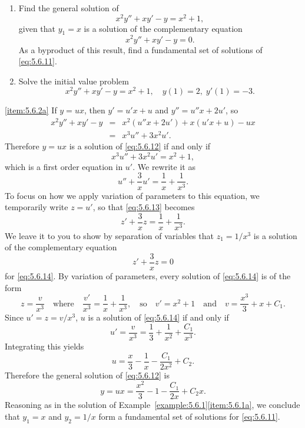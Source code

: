 \documentclass{ximera}
\begin{document}
\begin{example}\label{example:5.6.2}
\begin{enumerate}
\item \label{item:5.6.2a} %
Find the general solution of
$$
x^2y''+xy'-y=x^2+1,
$$
 given that $y_1=x$ is a solution of the complementary
equation
\begin{equation}  \label{eq:5.6.11}
x^2y''+xy'-y=0.
\end{equation}
  As a byproduct of this result, find a fundamental set of
solutions of \eqref{eq:5.6.11}.
 
\item \label{item:5.6.2b}%
Solve the initial value problem
\begin{equation}  \label{eq:5.6.12}
x^2y''+xy'-y=x^2+1, \quad   y(1)=2,\;  y'(1)=-3.
\end{equation}
\end{enumerate}
 
 
\begin{explanation}\ref{item:5.6.2a} If $y=ux$, then $y'=u'x+u$ and $y''=u''x+2u'$, so
\begin{eqnarray*}
x^2y''+xy'-y&=&x^2(u''x+2u')+x(u'x+u)-ux\\
&=&x^3u''+3x^2u'.
\end{eqnarray*}
Therefore $y=ux$ is a solution of \eqref{eq:5.6.12} if and only if
$$
x^3u''+3x^2u'=x^2+1,
$$
which is a first order equation in $u'$.
We rewrite it as
\begin{equation} \label{eq:5.6.13}
u''+\frac{3}{x}u'=\frac{1}{x}+\frac{1}{x^3}.
\end{equation}
To focus on how we apply variation of parameters to this equation, we
temporarily write $z=u'$, so that \eqref{eq:5.6.13} becomes
\begin{equation} \label{eq:5.6.14}
z'+\frac{3}{x}z=\frac{1}{x}+\frac{1}{x^3}.
\end{equation}
We leave it to you to show by separation of variables that
$z_1=1/x^3$ is a solution of the complementary equation
$$
z'+\frac{3}{x}z=0
$$
for \eqref{eq:5.6.14}. By variation of parameters, every solution of
\eqref{eq:5.6.14} is of the form
$$
z=\frac{v}{x^3}\quad\mbox{where}\quad
\frac{v'}{x^3}=\frac{1}{x}+\frac{1}{x^3}, \quad\mbox{so}\quad
 v'=x^2+1 \quad\mbox{and}\quad v=\frac{x^3}{3}+x+C_1.
$$
Since $u'=z=v/x^3$,   $u$ is a solution of \eqref{eq:5.6.14} if and only
if
$$
u'=\frac{v}{x^3}=\frac{1}{3}+\frac{1}{x^2}+\frac{C_1}{x^3}.
$$
Integrating this yields
$$
u=\frac{x}{3}-\frac{1}{x}-\frac{C_1}{2x^2}+C_2.
$$
Therefore the general solution of  \eqref{eq:5.6.12} is
\begin{equation} \label{eq:5.6.15}
y=ux=\frac{x^2}{3}-1-\frac{C_1}{2x}+C_2x.
\end{equation}
Reasoning as in  the solution of
Example~\ref{example:5.6.1}\ref{item:5.6.1a}, we  conclude that $y_1=x$ and $y_2=1/x$
form a fundamental set of solutions for \eqref{eq:5.6.11}.
 

\end{explanation}
\end{example}
\end{document}

